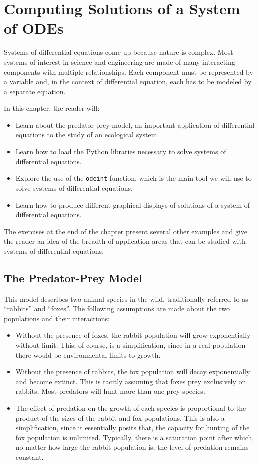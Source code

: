 \chapter{Computing Solutions of a System of ODEs}

Systems of differential equations come up because nature is complex. Most systems of interest in science and engineering are made of many interacting components with multiple relationships. Each component must be represented by a variable and, in the context of differential equation, each has to be modeled by a separate equation.

In this chapter, the reader will:

\begin{itemize}
\item Learn about the predator-prey model, an important application of differential equations to the study of an ecological system.
\item Learn how to load the Python libraries necessary to solve systems of differential equations.
\item Explore the use of the \texttt{odeint} function, which is the main tool we will use to solve systems of differential equations.
\item Learn how to produce different graphical displays of solutions of a system of differential equations.
\end{itemize}

The exercises at the end of the chapter present several other examples and give the reader an idea of the breadth of application areas that can be studied with systems of differential equations.

\section{The Predator-Prey Model}

This model describes two animal species in the wild, traditionally referred to as ``rabbits'' and ``foxes''. The following assumptions are made about the two populations and their interactions:

\begin{itemize}
\item Without the presence of foxes, the rabbit population will grow exponentially without limit. This, of course, is a simplification, since in a real population there would be environmental limits to growth.
\item Without the presence of rabbits, the fox population will decay exponentially and become extinct. This is tacitly assuming that foxes prey exclusively on rabbits. Most predators will hunt more than one prey species.
\item The effect of predation on the growth of each species is proportional to the product of the sizes of the rabbit and fox populations. This is also  a simplification, since it essentially posits that, the capacity for hunting of the fox population is unlimited. Typically, there is a saturation point after which, no matter how large the rabbit population is, the level of predation remains constant.
\end{itemize}

